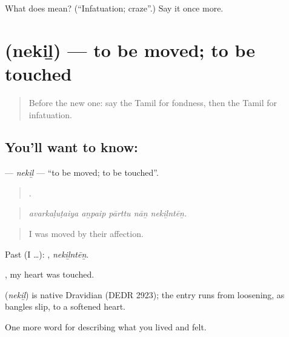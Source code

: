 \begin{tcolorbox}[breakable,colback=teal!4,colframe=teal!35!black,title={Before you move on}]
What does  mean? (\textquotedblleft{}Infatuation; craze\textquotedblright{}.) Say it once more.
\end{tcolorbox}
\section[\texorpdfstring{\ta{நெகிழ்} (nekiḻ)}{நெகிழ் (nekiḻ)}]{ (nekiḻ) — to be moved; to be touched}

\label{lesson:TA-C465-nekil}



\begin{quote}
Before the new one: say the Tamil for fondness, then the Tamil for infatuation.
\end{quote}

\subsection*{You'll want to know: }
\textbf{} — \emph{nekiḻ} — \textquotedblleft{}to be moved; to be touched\textquotedblright{}.

\begin{quote}
    .
\end{quote}

\begin{quote}
\emph{avarkaḷuṭaiya aṉpaip pārttu nāṉ nekiḻntēṉ.}
\end{quote}

\begin{quote}
I was moved by their affection.
\end{quote}

Past (I …): , \emph{nekiḻntēṉ}.

 , my heart was touched.

\begin{cousinweb}
\textbf{} (\emph{nekiḻ}) is native Dravidian (DEDR 2923); the entry runs from loosening, as bangles slip, to a softened heart.
\end{cousinweb}

\begin{grammarlens}[title={What you've built}]
One more word for describing what you lived and felt.
\end{grammarlens}

